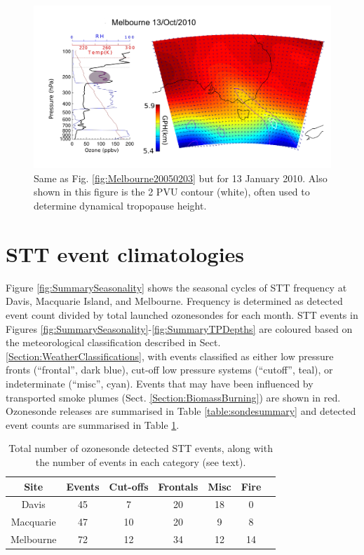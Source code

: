     \begin{figure}[t]
      \includegraphics[width=14.0cm]{figures/Melbourne20100113.png}
      \caption{Same as Fig. \ref{fig:Melbourne20050203} but for 13 January 2010.
	Also shown in this figure is the 2 PVU contour (white), often used to determine dynamical tropopause height.}
      \label{fig:Melbourne20100113}
    \end{figure}

\section{STT event climatologies}
  \label{sec:eventclimatologies}
  Figure \ref{fig:SummarySeasonality} shows the seasonal cycles of STT frequency at Davis, Macquarie Island, and Melbourne.
  Frequency is determined as detected event count divided by total launched ozonesondes for each month.
  STT events in Figures \ref{fig:SummarySeasonality}-\ref{fig:SummaryTPDepths} are coloured based on the meteorological classification described in Sect. \ref{Section:WeatherClassifications}, with events classified as either low pressure fronts (“frontal”, dark blue), cut-off low pressure systems (“cutoff”, teal), or indeterminate (“misc”, cyan).
  Events that may have been influenced by transported smoke plumes (Sect. \ref{Section:BiomassBurning}) are shown in red.
  Ozonesonde releases are summarised in Table \ref{table:sondesummary} and detected event counts are summarised in Table \ref{table:EventCounts}.
  \begin{table}[t]
    \caption{Total number of ozonesonde detected STT events, along with the number of events in each category (see text).}
    \begin{tabular}{ c   c   c   c   c   c   c } 
      \hline
      Site & Events & Cut-offs & Frontals & Misc & Fire \\
      \hline
      Davis     & 45 & 7  & 20 & 18 & 0 \\ 
      Macquarie & 47 & 10 & 20 & 9  & 8 \\
      Melbourne & 72 & 12 & 34 & 12 & 14 \\
      \hline
    \end{tabular}
    \label{table:EventCounts}
  \end{table}
  
